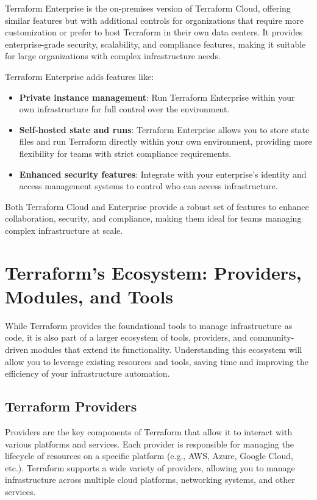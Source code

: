 Terraform Enterprise is the on-premises version of Terraform Cloud, offering similar features but with additional controls for organizations that require more customization or prefer to host Terraform in their own data centers. It provides enterprise-grade security, scalability, and compliance features, making it suitable for large organizations with complex infrastructure needs.

Terraform Enterprise adds features like:

\begin{itemize}
  \item \textbf{Private instance management}: Run Terraform Enterprise within your own infrastructure for full control over the environment.
  \item \textbf{Self-hosted state and runs}: Terraform Enterprise allows you to store state files and run Terraform directly within your own environment, providing more flexibility for teams with strict compliance requirements.
  \item \textbf{Enhanced security features}: Integrate with your enterprise's identity and access management systems to control who can access infrastructure.
\end{itemize}

Both Terraform Cloud and Enterprise provide a robust set of features to enhance collaboration, security, and compliance, making them ideal for teams managing complex infrastructure at scale.

\section{Terraform's Ecosystem: Providers, Modules, and Tools}

While Terraform provides the foundational tools to manage infrastructure as code, it is also part of a larger ecosystem of tools, providers, and community-driven modules that extend its functionality. Understanding this ecosystem will allow you to leverage existing resources and tools, saving time and improving the efficiency of your infrastructure automation.

\subsection{Terraform Providers}

Providers are the key components of Terraform that allow it to interact with various platforms and services. Each provider is responsible for managing the lifecycle of resources on a specific platform (e.g., AWS, Azure, Google Cloud, etc.). Terraform supports a wide variety of providers, allowing you to manage infrastructure across multiple cloud platforms, networking systems, and other services.

